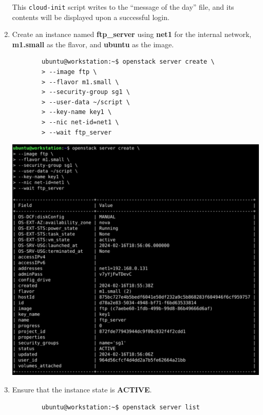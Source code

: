\documentclass[letterpaper, 12pt]{article}
\begin{document}
\begin{enumerate}
    \begin{notebox}
        This \texttt{cloud-init} script writes to the ``message of the day'' file, and its contents will be displayed
        upon a successful login.
    \end{notebox}

    \item Create an instance named \textbf{ftp\_server} using \textbf{net1} for the internal network, \textbf{m1.small}
    as the flavor, and \textbf{ubuntu} as the image.
    \begin{lstlisting}
        ubuntu@workstation:~$ openstack server create \
        > --image ftp \
        > --flavor m1.small \
        > --security-group sg1 \
        > --user-data ~/script \
        > --key-name key1 \
        > --nic net-id=net1 \
        > --wait ftp_server
    \end{lstlisting}

    \begin{center}
        \includegraphics[width=\linewidth]{images/part1/step36.png}
    \end{center}

    \item Ensure that the instance state is \textbf{ACTIVE}.
    \begin{lstlisting}
        ubuntu@workstation:~$ openstack server list
    \end{lstlisting}


\end{enumerate}
\end{document}
